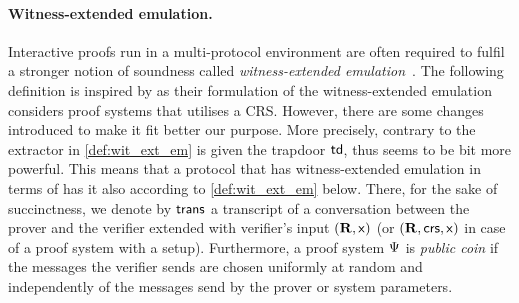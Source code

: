 \documentclass[runningheads,11pt]{llncs}
\theoremstyle{definition}
\begin{document}
\paragraph{Witness-extended emulation.}
Interactive proofs run in a multi-protocol environment are often required to fulfil a stronger notion of soundness called \emph{witness-extended emulation}~\cite{JC:Lindell03}.
The following definition is inspired by  \cite{EC:GroIsh08} as their formulation
of the witness-extended emulation considers proof systems that utilises a CRS.
However, there are some changes introduced to make it fit better our purpose.
More precisely, contrary to \cite{EC:GroIsh08,EC:BCCGP16} the extractor in
\cref{def:wit_ext_em} is given the trapdoor $\mathsf{td}$, thus seems to be bit more
powerful.
This means that a protocol that has witness-extended emulation in terms of \cite{EC:GroIsh08} has it also according to \cref{def:wit_ext_em} below.
There, for the sake of succinctness, we denote by $\mathsf{trans}$ a transcript of a conversation between the prover and the verifier extended with verifier's input $(\mathbf{R}, \mathsf{x})$ (or $(\mathbf{R}, \mathsf{crs}, \mathsf{x})$ in case of a proof system with a setup).
Furthermore, a proof system $\mathrm{\Psi}$ is \emph{public coin} if the messages the verifier sends are chosen uniformly at random and independently of the messages send by the prover or system parameters.
\end{document}
